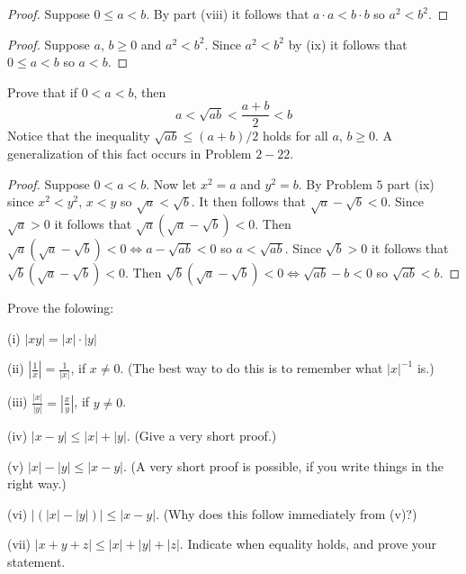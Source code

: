 \begin{proof}
    Suppose $0 \le a < b$.
    By part (viii) it follows that $a \cdot a < b \cdot b$
        so $a^2 < b^2$.
\end{proof}

\begin{proof}
    Suppose $a$, $b \ge 0$ and $a^2 < b^2$.
    Since $a^2 < b^2$ by (ix) it follows that $0 \le a < b$
        so $a < b$.
\end{proof}

\begin{tcolorbox}[title=Problem 7, breakable]
    Prove that if $0 < a < b$, then 
    \[a < \sqrt{ab} < \frac{a + b}{2} < b\]
    Notice that the inequality $\sqrt{ab} \le (a + b) / 2$ holds 
    for all $a$, $b \ge 0$. A generalization of this fact occurs in 
    Problem $2-22$.
\end{tcolorbox}

\begin{proof}
    Suppose $0 < a < b$.
    Now let $x^2 = a$ and $y^2 = b$.
    By Problem $5$ part (ix) since $x^2 < y^2$, $x < y$ so $\sqrt{a} < \sqrt{b}$.
    It then follows that $\sqrt{a} - \sqrt{b} < 0$.
    Since $\sqrt{a} > 0$ it follows that $\sqrt{a}(\sqrt{a} - \sqrt{b}) < 0$.
    Then $\sqrt{a}(\sqrt{a} - \sqrt{b}) < 0 \iff a - \sqrt{ab} < 0$ so $a < \sqrt{ab}$.
    Since $\sqrt{b} > 0$ it follows that $\sqrt{b}(\sqrt{a} - \sqrt{b}) < 0$.
    Then $\sqrt{b}(\sqrt{a} - \sqrt{b}) < 0 \iff \sqrt{ab} - b < 0$ so $\sqrt{ab} < b$.
\end{proof}

\begin{tcolorbox}[title=Problem 12, breakable]
    Prove the folowing:

    (i) $|xy| = |x| \cdot |y|$

    (ii) $|\frac{1}{x}| = \frac{1}{|x|}$, if $x \not = 0$. (The best way to do this 
    is to remember what ${|x|}^{-1}$ is.)

    (iii) $\frac{|x|}{|y|} = |\frac{x}{y}|$, if $y \not = 0$.

    (iv) $|x - y| \le |x| + |y|$. (Give a very short proof.)

    (v) $|x| - |y| \le |x - y|$. (A very short proof is possible, if you write things 
    in the right way.)

    (vi) $|(|x| - |y|)| \le |x - y|$. (Why does this follow immediately from (v)?)

    (vii) $|x + y + z| \le |x| + |y| + |z|$. Indicate when equality holds, and prove 
    your statement.
\end{tcolorbox}

